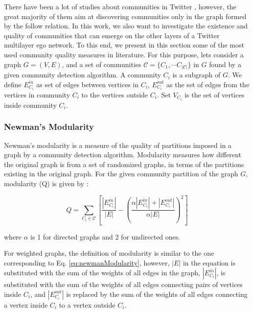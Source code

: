 There have been a lot of studies about communities in Twitter \cite{McAuley:2012, Lim2012, Amitava:2012, Darmon2015, Amati2015, Mert2016, Achiam2016, Lim2016}, however, the great majority of them aim at discovering communities only in the graph formed by the follow relation. In this work, we also want to investigate the existence and quality of communities that can emerge on the other layers of a Twitter multilayer ego network. To this end, we present in this section some of the most used community quality measures in literature. For this purpose, lets consider a graph $G=(V,E)$, and a set of communities  $\mathcal{C}=\{C_1,\cdots C_{|\mathcal{C}|}\}$ in $G$ found by a given community detection algorithm. A community $C_i$ is a subgraph of $G$. We define $E_{C_i}^{in}$ as set of edges between vertices in $C_i$, $E_{C_i}^{out}$ as the set of edges  from the vertices  in community $C_i$ to the vertices outside $C_i$. Set $V_{C_i}$ is the set of vertices inside community $C_i$.



\subsubsection*{Newman{'}s Modularity}
\label{subsec:newman_modularity}
Newman{'}s modularity \cite{Newman2004b,Newman8577} is a measure of the quality of partitions imposed in a graph by a community detection algorithm.  Modularity measures how different the original graph is from a set of randomized graphs, in terms of the partitions existing in the original graph. For the given community partition of the graph $G$, modularity (Q) is given by \cite{Szymanski2013}:

\begin{equation}\label{eq:newmanModularity}
Q= \sum_{C_i \in \mathcal{C}} \left[ \frac{|E_{C_i}^{in}|}{|E|} - \left(  \frac{\alpha |E_{C_i}^{in}|+|E_{C_i}^{out}|}{\alpha |E|} \right) ^2 \right]
\end{equation}

where $\alpha$ is 1 for directed graphs and 2 for undirected ones. 

For weighted graphs, the definition of modularity is similar to the one corresponding to Eq. \ref{eq:newmanModularity}, however, $|E|$ in the equation is substituted with the sum of the weights of all edges in the graph,  $|E_{C_i}^{in}|$, is substituted with  the sum of the weights of all edges connecting  pairs of vertices inside $C_i$,  and $|E_{C_i}^{out}|$ is replaced by the sum of the weights of all edges connecting a vertex inside $C_i$ to a vertex outside $C_i$.


